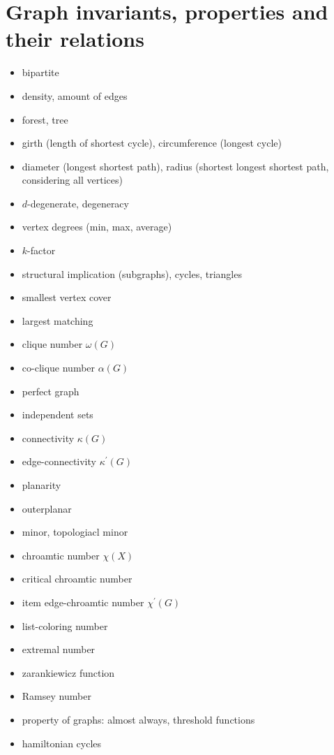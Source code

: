 \documentclass[a4paper]{article}
\begin{document}
\section{Graph invariants, properties and their relations}
\begin{itemize}
    \item bipartite
    \item density, amount of edges 
    \item forest, tree 
    \item girth (length of shortest cycle), circumference (longest cycle)
    \item diameter (longest shortest path),
    radius (shortest longest shortest path, considering all vertices)
    \item $d$-degenerate, degeneracy
    \item vertex degrees (min, max, average)
    \item $k$-factor
    \item structural implication (subgraphs), cycles, triangles 
    \item smallest vertex cover
    \item largest matching
    \item clique number $ \omega(G)$ 
    \item co-clique number $ \alpha(G) $
    \item perfect graph
    \item independent sets
    \item connectivity $ \kappa(G) $
    \item edge-connectivity $ \kappa^\prime(G) $
    \item planarity 
    \item outerplanar
    \item minor, topologiacl minor
    \item chroamtic number $ \chi(X) $
    \item critical chroamtic number
    \item item edge-chroamtic number $ \chi^\prime(G) $
    \item list-coloring number
    \item extremal number
    \item zarankiewicz function
    \item Ramsey number 
    \item property of graphs: almost always, threshold functions
    \item hamiltonian cycles 
\end{itemize}
\end{document}
